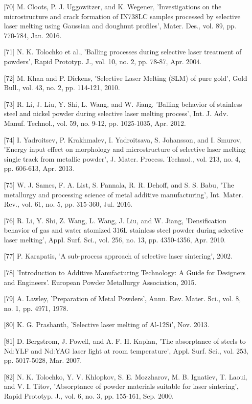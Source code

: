 \documentclass[10pt]{article}
\begin{document}
[70] M. Cloots, P. J. Uggowitzer, and K. Wegener, 'Investigations on the microstructure and crack formation of IN738LC samples processed by selective laser melting using Gaussian and doughnut profiles', Mater. Des., vol. 89, pp. 770-784, Jan. 2016.

[71] N. K. Tolochko et al., 'Balling processes during selective laser treatment of powders', Rapid Prototyp. J., vol. 10, no. 2, pp. 78-87, Apr. 2004.

[72] M. Khan and P. Dickens, 'Selective Laser Melting (SLM) of pure gold', Gold Bull., vol. 43, no. 2, pp. 114-121, 2010.

[73] R. Li, J. Liu, Y. Shi, L. Wang, and W. Jiang, 'Balling behavior of stainless steel and nickel powder during selective laser melting process', Int. J. Adv. Manuf. Technol., vol. 59, no. 9-12, pp. 1025-1035, Apr. 2012.

[74] I. Yadroitsev, P. Krakhmalev, I. Yadroitsava, S. Johansson, and I. Smurov, 'Energy input effect on morphology and microstructure of selective laser melting single track from metallic powder', J. Mater. Process. Technol., vol. 213, no. 4, pp. 606-613, Apr. 2013.

[75] W. J. Sames, F. A. List, S. Pannala, R. R. Dehoff, and S. S. Babu, 'The metallurgy and processing science of metal additive manufacturing', Int. Mater. Rev., vol. 61, no. 5, pp. 315-360, Jul. 2016.

[76] R. Li, Y. Shi, Z. Wang, L. Wang, J. Liu, and W. Jiang, 'Densification behavior of gas and water atomized 316L stainless steel powder during selective laser melting', Appl. Surf. Sci., vol. 256, no. 13, pp. 4350-4356, Apr. 2010.

[77] P. Karapatis, 'A sub-process approach of selective laser sintering', 2002.

[78] 'Introduction to Additive Manufacturing Technology: A Guide for Designers and Engineers'. European Powder Metallurgy Association, 2015.

[79] A. Lawley, 'Preparation of Metal Powders', Annu. Rev. Mater. Sci., vol. 8, no. 1, pp. 4971, 1978.

[80] K. G. Prashanth, 'Selective laser melting of Al-12Si', Nov. 2013.

[81] D. Bergstrom, J. Powell, and A. F. H. Kaplan, 'The absorptance of steels to Nd:YLF and Nd:YAG laser light at room temperature', Appl. Surf. Sci., vol. 253, pp. 5017-5028, Mar. 2007.

[82] N. K. Tolochko, Y. V. Khlopkov, S. E. Mozzharov, M. B. Ignatiev, T. Laoui, and V. I. Titov, 'Absorptance of powder materials suitable for laser sintering', Rapid Prototyp. J., vol. 6, no. 3, pp. 155-161, Sep. 2000.
\end{document}
